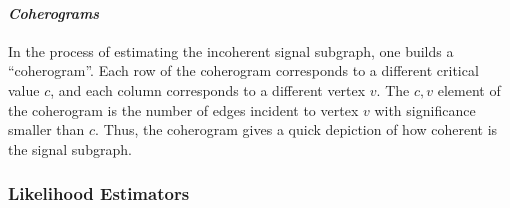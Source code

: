 \documentclass[10pt,journal,cspaper,compsoc]{IEEEtran}
\begin{document}
\paragraph{\emph{Coherograms}}

In the process of estimating the incoherent signal subgraph, one builds a ``coherogram''.  Each row of the coherogram corresponds to a different critical value $c$, and each column corresponds to a different vertex $v$.  The $c,v$ element of the coherogram is the number of edges incident to vertex $v$ with significance smaller than $c$.  Thus, the coherogram gives a quick depiction of how coherent is the signal subgraph.


\subsubsection{Likelihood Estimators} %
\label{sub:likelihood}
\end{document}
